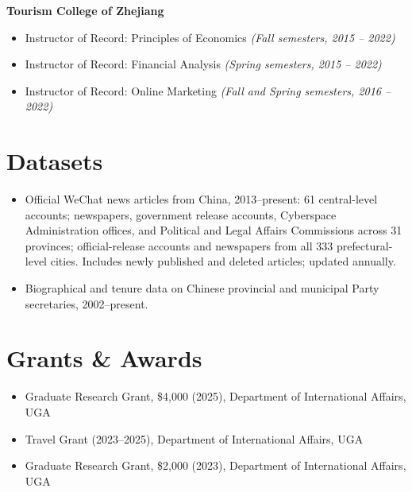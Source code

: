 \documentclass[11pt]{article}
\begin{document}
	\textbf{Tourism College of Zhejiang}
	\begin{itemize}
		\item Instructor of Record: Principles of Economics \emph{(Fall semesters, 2015 -- 2022)}
		\item Instructor of Record: Financial Analysis \emph{(Spring semesters, 2015 -- 2022)}
		\item Instructor of Record: Online Marketing \emph{(Fall and Spring semesters, 2016 -- 2022)}
	\end{itemize}
	
	\section*{Datasets}
	\begin{itemize}
		\item Official WeChat news articles from China, 2013--present: 61 central-level accounts; newspapers, government release accounts, Cyberspace Administration offices, and Political and Legal Affairs Commissions across 31 provinces; official-release accounts and newspapers from all 333 prefectural-level cities. Includes newly published and deleted articles; updated annually.
		\item Biographical and tenure data on Chinese provincial and municipal Party secretaries, 2002--present.
	\end{itemize}
	
	\section*{Grants \& Awards}
	\begin{itemize}
		\item Graduate Research Grant, \$4{,}000 (2025), Department of International Affairs, UGA
		\item Travel Grant (2023--2025), Department of International Affairs, UGA
		\item Graduate Research Grant, \$2{,}000 (2023), Department of International Affairs, UGA
	\end{itemize}
	
\end{document}
